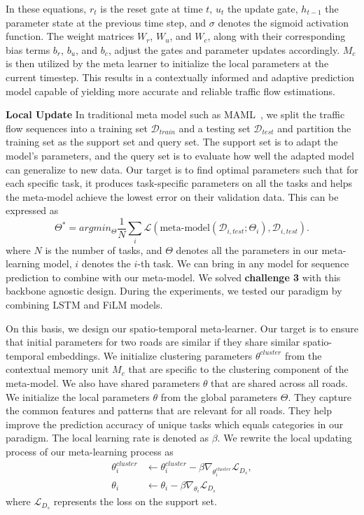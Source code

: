 \documentclass[lettersize,journal]{IEEEtran}
\begin{document}
In these equations, $r_t$ is the reset gate at time $t$, $u_t$ the update gate, $h_{t-1}$ the parameter state at the previous time step, and $\sigma$ denotes the sigmoid activation function. The weight matrices $W_r$, $W_u$, and $W_c$, along with their corresponding bias terms $b_r$, $b_u$, and $b_c$, adjust the gates and parameter updates accordingly. $M_c$ is then utilized by the meta learner to initialize the local parameters at the current timestep. This results in a contextually informed and adaptive prediction model capable of yielding more accurate and reliable traffic flow estimations.

\color{black}

\textbf{Local Update}
In traditional meta model such as MAML~\cite{DBLP:journals/corr/FinnAL17}, we split the traffic flow sequences into a training set $\mathcal{D}_{train}$ and a testing set $\mathcal{D}_{test}$ and partition the training set as the support set and query set. The support set is to adapt the model's parameters, and the query set is to evaluate how well the adapted model can generalize to new data. Our target is to find optimal parameters such that for each specific task, it produces task-specific parameters on all the tasks and helps the meta-model achieve the lowest error on their validation data. This can be expressed as
\begin{equation}
    \Theta^* = arg min_{\Theta} \frac{1}{N} \sum_i \mathcal{L}(\text{meta-model}(\mathcal{D}_{i,test} ; \Theta_i) , \mathcal{D}_{i,test}).
\end{equation}
where $N$ is the number of tasks, and $\Theta$ denotes all the parameters in our meta-learning model, $i$ denotes the $i$-th task. We can bring in any model for sequence prediction to combine with our meta-model. We solved \textbf{challenge 3} with this backbone agnostic design. During the experiments, we tested our paradigm by combining LSTM and FiLM models.

\color{blue}

On this basis, we design our spatio-temporal meta-learner. Our target is to ensure that initial parameters for two roads are similar if they share similar spatio-temporal embeddings. We initialize clustering parameters $\theta^{cluster}$ from the contextual memory unit $M_c$ that are specific to the clustering component of the meta-model. We also have shared parameters $\theta$ that are shared across all roads.  We initialize the local parameters $\theta$ from the global parameters $\Theta$. They capture the common features and patterns that are relevant for all roads. They help improve the prediction accuracy of unique tasks which equals categories in our paradigm. The local learning rate is denoted as $\beta$. We rewrite the local updating process of our meta-learning process as
\begin{align}
\theta_i^{cluster} & \xleftarrow{} \theta_i^{cluster} - \beta \nabla_{\theta_i^{cluster}} \mathcal{L}_{D_s},\\
\theta_i & \xleftarrow{} \theta_i - \beta \nabla_{\theta_i} \mathcal{L}_{D_s}
\end{align}
where $\mathcal{L}_{D_s}$ represents the loss on the support set.
\end{document}
